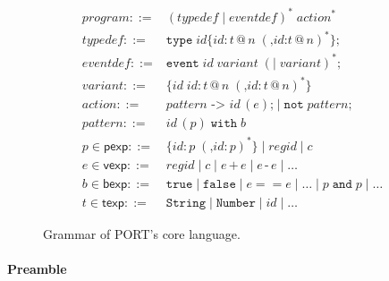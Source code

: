 \begin{figure}[t]
\centering
\scriptsize
\begin{align*}
\mathit{program} ::= {} &  (\mathit{typedef} \mid \mathit{eventdef})^* \; \mathit{action}^*\\
\mathit{typedef} ::= {} & \mathtt{type}\; \mathit{id} \texttt{\{}\mathit{id} \texttt{:}\, t\, \texttt{@}\, n \; (\texttt{,} \mathit{id}\texttt{:} t\,\texttt{@}\,n)^*\texttt{\};}\\
\mathit{eventdef} ::= {} & \mathtt{event}\; \mathit{id} \; \mathit{variant} \; (\texttt{|}\; \mathit{variant})^*\texttt{;}\\
\mathit{variant} ::= {} & \texttt{\{}\mathit{id}\; \mathit{id}\texttt{:}\, t\,\texttt{@}\,n \; (\texttt{,} \mathit{id}\texttt{:}\, t\,\texttt{@}\,n)^*\texttt{\}}\\
\mathit{action} ::= {} & \mathit{pattern} \texttt{ -> } \mathit{id}\,(e) \texttt{;} \mid \mathtt{not} \; \mathit{pattern} \texttt{;}\\
\mathit{pattern} ::= {} & \mathit{id}\,(p) \;\mathtt{with}\; b\\
p \in \mathsf{pexp} ::= {} & \texttt{\{} \mathit{id}\texttt{:}\, p \; (\texttt{,} \mathit{id}\texttt{:}\, p)^*\texttt{\}} \mid \mathit{regid} \mid c \\
e \in \mathsf{vexp} ::= {} & \mathit{regid} \mid c \mid e \,\texttt{+}\, e \mid e \,\texttt{-}\, e \mid \dots\\
b \in \mathsf{bexp} ::= {} & \mathtt{true} \mid \mathtt{false} \mid e == e \mid \ldots \mid p \;\mathtt{and}\; p \mid \dots\\
t \in \mathsf{texp} ::= {} & \mathtt{String} \mid \mathtt{Number} \mid \mathit{id} \mid \dots
\end{align*}
\caption{Grammar of PORT's core language.}
\label{lst:SyntaxGrammar}
\end{figure}

\paragraph*{Preamble}

